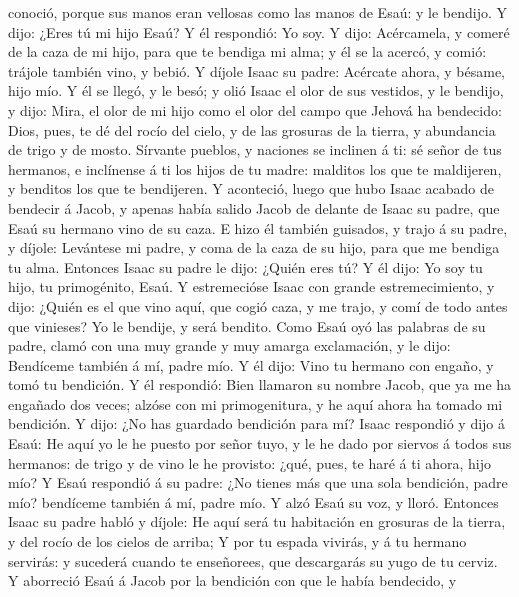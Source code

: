 conoció, porque sus manos eran vellosas como las manos de Esaú: y le
bendijo.  Y dijo: ¿Eres tú mi hijo Esaú? Y él respondió: Yo
soy.  Y dijo: Acércamela, y comeré de la caza de mi hijo,
para que te bendiga mi alma; y él se la acercó, y comió: trájole también
vino, y bebió.  Y díjole Isaac su padre: Acércate ahora, y
bésame, hijo mío.  Y él se llegó, y le besó; y olió Isaac
el olor de sus vestidos, y le bendijo, y dijo: Mira, el olor de mi hijo
como el olor del campo que Jehová ha bendecido:  Dios,
pues, te dé del rocío del cielo, y de las grosuras de la tierra, y
abundancia de trigo y de mosto.  Sírvante pueblos, y
naciones se inclinen á ti: sé señor de tus hermanos, e inclínense á ti
los hijos de tu madre: malditos los que te maldijeren, y benditos los
que te bendijeren.  Y aconteció, luego que hubo Isaac
acabado de bendecir á Jacob, y apenas había salido Jacob de delante de
Isaac su padre, que Esaú su hermano vino de su caza.  E
hizo él también guisados, y trajo á su padre, y díjole: Levántese mi
padre, y coma de la caza de su hijo, para que me bendiga tu alma.
 Entonces Isaac su padre le dijo: ¿Quién eres tú? Y él
dijo: Yo soy tu hijo, tu primogénito, Esaú.  Y estremecióse
Isaac con grande estremecimiento, y dijo: ¿Quién es el que vino aquí,
que cogió caza, y me trajo, y comí de todo antes que vinieses? Yo le
bendije, y será bendito.  Como Esaú oyó las palabras de su
padre, clamó con una muy grande y muy amarga exclamación, y le dijo:
Bendíceme también á mí, padre mío.  Y él dijo: Vino tu
hermano con engaño, y tomó tu bendición.  Y él respondió:
Bien llamaron su nombre Jacob, que ya me ha engañado dos veces; alzóse
con mi primogenitura, y he aquí ahora ha tomado mi bendición. Y dijo:
¿No has guardado bendición para mí?  Isaac respondió y dijo
á Esaú: He aquí yo le he puesto por señor tuyo, y le he dado por siervos
á todos sus hermanos: de trigo y de vino le he provisto: ¿qué, pues, te
haré á ti ahora, hijo mío?  Y Esaú respondió á su padre:
¿No tienes más que una sola bendición, padre mío? bendíceme también á
mí, padre mío. Y alzó Esaú su voz, y lloró.  Entonces Isaac
su padre habló y díjole: He aquí será tu habitación en grosuras de la
tierra, y del rocío de los cielos de arriba;  Y por tu
espada vivirás, y á tu hermano servirás: y sucederá cuando te
enseñorees, que descargarás su yugo de tu cerviz.  Y
aborreció Esaú á Jacob por la bendición con que le había bendecido, y
